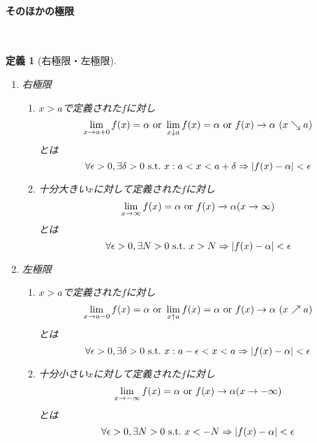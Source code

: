 \documentclass[dvipdfmx,a4j,10pt]{jsarticle}
\theoremstyle{mystyle1}
\newtheorem{dfn}{定義}[part]
\theoremstyle{mystyle2}
\begin{document}
\newpage

\paragraph{そのほかの極限}
　
\begin{framed}
    \begin{dfn}[右極限・左極限]　
        \begin{enumerate}
        \renewcommand{\labelenumi}{\Roman{enumi}.}
        \item 右極限
            \begin{enumerate}
            \renewcommand{\labelenumii}{\arabic{enumii}.}
            \item $x>a$で定義された$f$に対し
            \[
            \lim_{x\to a+0} f(x)=\alpha \ {\rm or}\ \lim_{x\downarrow a}f(x)=\alpha \ {\rm or} \ f(x)\to\alpha\ (x\searrow a)
            \]
            とは
            \[
            \forall\epsilon>0,\exists\delta>0\ {\rm s.t.}\ x:a<x<a+\delta \Rightarrow |f(x)-\alpha|<\epsilon
            \]

            \item 十分大きい$x$に対して定義された$f$に対し
            \[
            \lim_{x\to\infty}f(x)=\alpha\ {\rm or}\ f(x)\to\alpha(x\to \infty)
            \]
            とは
            \[
            \forall\epsilon>0,\exists N>0\ {\rm s.t.}\ x>N\Rightarrow |f(x)-\alpha|<\epsilon
            \]
            \end{enumerate}
        \item 左極限
            \begin{enumerate}
            \renewcommand{\labelenumii}{\arabic{enumii}.}
            \item $x>a$で定義された$f$に対し
            \[
            \lim_{x\to a-0} f(x)=\alpha \ {\rm or}\ \lim_{x\uparrow a}f(x)=\alpha \ {\rm or} \ f(x)\to\alpha\ (x\nearrow a)
            \]
            とは
            \[
            \forall\epsilon>0,\exists\delta>0\ {\rm s.t.}\ x:a-\epsilon<x<a \Rightarrow |f(x)-\alpha|<\epsilon
            \]
            \item 十分小さい$x$に対して定義された$f$に対し
            \[
            \lim_{x\to-\infty}f(x)=\alpha\ {\rm or}\ f(x)\to\alpha(x\to -\infty)
            \]
            とは
            \[
            \forall\epsilon>0,\exists N>0\ {\rm s.t.}\ x<-N\Rightarrow |f(x)-\alpha|<\epsilon
            \]
            \end{enumerate}
        \end{enumerate}
    \end{dfn}
\end{framed}
\end{document}
